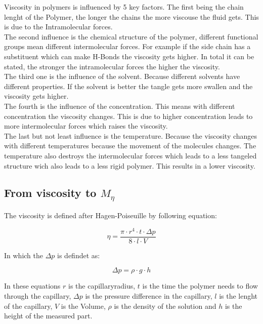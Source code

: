 \documentclass[10pt,a4paper,ngerman]{scrartcl}
\begin{document}
		
		

		Viscosity in polymers is influenced by 5 key factors.
		The first being the chain lenght of the Polymer, the longer the chains the more viscouse the fluid gets.
		This is due to the Intramolecular forces.\\
		The second influence is the chemical structure of the polymer, different functional groups mean different intermolecular forces.
		For example if the side chain has a substituent which can make H-Bonds the viscosity gets higher.
		In total it can be stated, the stronger the intramolecular forces the higher the viscosity.\\

		The third one is the influence of the solvent. Because different solvents have different properties.
		If the solvent is better the tangle gets more swallen and the viscosity gets higher.\\

		The fourth is the influence of the concentration. This means with different concentration the viscosity changes.
		This is due to higher concentration leads to more intermolecular forces which raises the viscosity.\\

		The last but not least influence is the temperature. Because the viscosity changes with different temperatures because the movement of the molecules changes.
		The temperature also destroys the intermolecular forces which leads to a less tangeled structure wich also leads to a less rigid polymer.
		This results in a lower viscosity.\\

	\subsection{From viscosity to $M_\eta$}

		The viscosity is defined after Hagen-Poiseuille by following equation:

			\begin{equation}
				\eta = \frac{\pi\cdot r^4 \cdot t \cdot \Delta p}{8\cdot l \cdot V}
				\label{viscosity}
			\end{equation}

		In which the $\Delta p$ is defindet as:
			
			\begin{equation}
				\Delta p = \rho \cdot g \cdot h
			\end{equation}

		In these equations $r$ is the capillaryradius, $t$ is the time the polymer needs to flow through the capillary,
		$\Delta p$ is the pressure difference in the capillary, $l$ is the lenght of the capillary, $V$ is the Volume, 
		$\rho$ is the density of the solution and $h$ is the height of the measured part.
\end{document}
